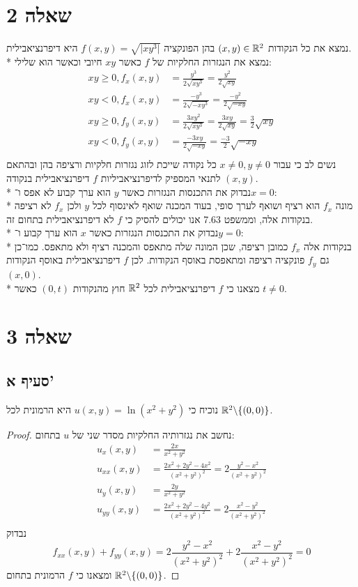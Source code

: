\section{שאלה 2}
נמצא את כל הנקודות $(x, y) \in \mathbb{R}^2$ בהן הפונקציה $f(x, y) = \sqrt{\lvert xy^3 \rvert}$ היא דיפרנציאבילית. \\*
נמצא את הנגזרות החלקיות של $f$ כאשר $xy$ חיובי וכאשר הוא שלילי:
\begin{align*}
	xy \ge 0, f_x(x, y)
	& = \frac{y^3}{2 \sqrt{xy^3}}
	= \frac{y^2}{2 \sqrt{xy}} \\
	xy < 0, f_x(x, y)
	& = \frac{-y^3}{2 \sqrt{-xy^3}}
	= \frac{-y^2}{2 \sqrt{-xy}} \\
	xy \ge 0, f_y(x, y)
	& = \frac{3xy^2}{2 \sqrt{xy^3}}
	= \frac{3xy}{2 \sqrt{xy}}
	= \frac{3}{2} \sqrt{xy} \\
	xy < 0, f_y(x, y)
	& = \frac{-3xy}{2 \sqrt{-xy}}
	= \frac{-3}{2} \sqrt{-xy} \\
\end{align*}
נשים לב כי עבור $x \ne 0, y \ne 0$ כל נקודה שייכת לזוג נגזרות חלקיות ורציפה בהן ובהתאם לתנאי המספיק לדיפרנציאביליות $f$ דיפרנציאבילית בנקודה $(x, y)$. \\*
נבדוק את התכנסות הנגזרות כאשר $y$ הוא ערך קבוע לא אפס ו־$x = 0$: \\*
מונה $f_x$ הוא רציף ושואף לערך סופי, בעוד המכנה שואף לאינסוף לכל $y$ ולכן $f_x$ לא רציפה בנקודות אלה,
וממשפט 7.63 אנו יכולים להסיק כי $f$ לא דיפרנציאבילית בתחום זה. \\*
נבדוק את התכנסות הנגזרות כאשר $x$ הוא ערך קבוע ו־$y = 0$: \\*
בנקודות אלה $f_x$ כמובן רציפה, שכן המונה שלה מתאפס והמכנה רציף ולא מתאפס. כמו־כן גם $f_y$ פונקציה רציפה ומתאפסת באוסף הנקודות.
לכן $f$ דיפרנציאבילית באוסף הנקודות $(x, 0)$. \\*
מצאנו כי $f$ דיפרנציאבילית לכל $\mathbb{R}^2$ חוץ מהנקודות $(0, t)$ כאשר $t \ne 0$.

\section{שאלה 3}
\subsection{סעיף א'}
נוכיח כי $u(x, y) = \ln(x^2 + y^2)$ היא הרמונית לכל $\mathbb{R}^2 \backslash \{(0, 0)\}$.
\begin{proof}
	נחשב את נגזרותיה החלקיות מסדר שני של $u$ בתחום:
	\begin{align*}
		u_x(x, y) & = \frac{2x}{x^2 + y^2} \\
		u_{xx}(x, y) & = \frac{2x^2 + 2y^2 - 4x^2}{{(x^2 + y^2)}^2} = 2\frac{y^2 - x^2}{{(x^2 + y^2)}^2} \\
		u_y(x, y) & = \frac{2y}{x^2 + y^2} \\
		u_{yy}(x, y) & = \frac{2x^2 + 2y^2 - 4y^2}{{(x^2 + y^2)}^2} = 2\frac{x^2 - y^2}{{(x^2 + y^2)}^2} \\
	\end{align*}
	נבדוק
	\[
		f_{xx}(x, y) + f_{yy}(x, y)
		= 2\frac{y^2 - x^2}{{(x^2 + y^2)}^2} + 2\frac{x^2 - y^2}{{(x^2 + y^2)}^2}
		= 0
	\]
	ומצאנו כי $f$ הרמונית בתחום $\mathbb{R}^2\backslash\{(0, 0)\}$.
\end{proof}

